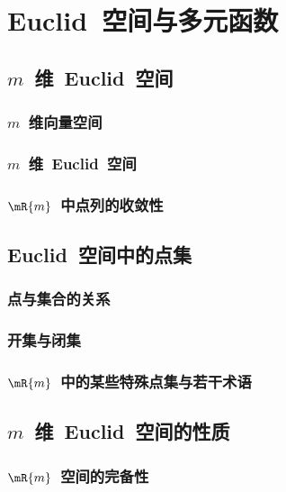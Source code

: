 

\chapter{Euclid~空间与多元函数}\label{ch:15}
\section{$m$~维~Euclid~空间}
\subsection{$m$~维向量空间}
\subsection{$m$~维~Euclid~空间}
\subsection{$\mR{m}$~中点列的收敛性}
\begin{exercise}
\item
\end{exercise}
\section{Euclid~空间中的点集}
\subsection{点与集合的关系}
\subsection{开集与闭集}
\subsection{$\mR{m}$~中的某些特殊点集与若干术语}
\begin{exercise}
\item
\end{exercise}
\section{$m$~维~Euclid~空间的性质}
\subsection{$\mR{m}$~空间的完备性}
